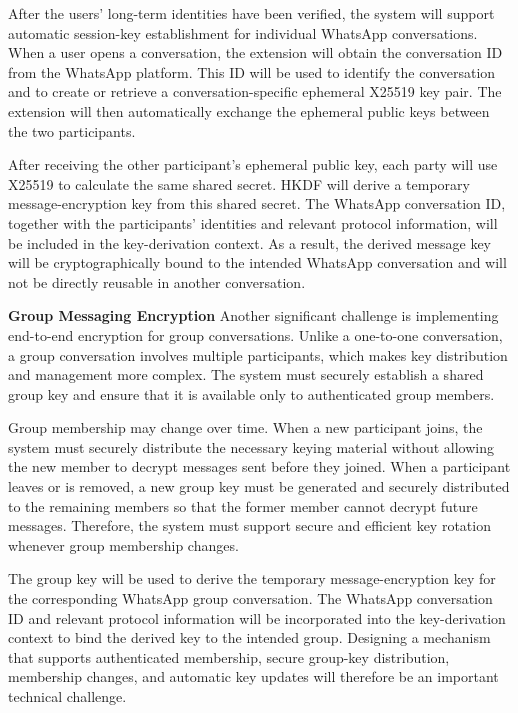 \documentclass[11pt]{article}
\begin{document}
 After the users’ long-term identities have been verified, the system will support automatic session-key establishment for individual WhatsApp conversations. When a user opens a conversation, the extension will obtain the conversation ID from the WhatsApp platform. This ID will be used to identify the conversation and to create or retrieve a conversation-specific ephemeral X25519 key pair. The extension will then automatically exchange the ephemeral public keys between the two participants.

 After receiving the other participant’s ephemeral public key, each party will use X25519 to calculate the same shared secret. HKDF will derive a temporary message-encryption key from this shared secret. The WhatsApp conversation ID, together with the participants’ identities and relevant protocol information, will be included in the key-derivation context. As a result, the derived message key will be cryptographically bound to the intended WhatsApp conversation and will not be directly reusable in another conversation.

 \textbf{Group Messaging Encryption}
 Another significant challenge is implementing end-to-end encryption for group conversations. Unlike a one-to-one conversation, a group conversation involves multiple participants, which makes key distribution and management more complex. The system must securely establish a shared group key and ensure that it is available only to authenticated group members.

 Group membership may change over time. When a new participant joins, the system must securely distribute the necessary keying material without allowing the new member to decrypt messages sent before they joined. When a participant leaves or is removed, a new group key must be generated and securely distributed to the remaining members so that the former member cannot decrypt future messages. Therefore, the system must support secure and efficient key rotation whenever group membership changes.

 The group key will be used to derive the temporary message-encryption key for the corresponding WhatsApp group conversation. The WhatsApp conversation ID and relevant protocol information will be incorporated into the key-derivation context to bind the derived key to the intended group. Designing a mechanism that supports authenticated membership, secure group-key distribution, membership changes, and automatic key updates will therefore be an important technical challenge.
\end{document}
